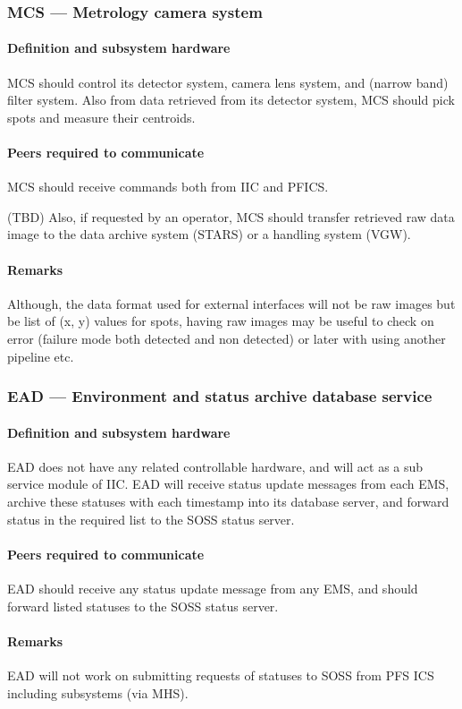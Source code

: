 \documentclass[a4paper,notitlepage]{article}
\begin{document}
\subsubsection{MCS --- Metrology camera system}
\paragraph{Definition and subsystem hardware}
MCS should control its detector system, camera lens system, and (narrow band) 
filter system. Also from data retrieved from its detector system, MCS should 
pick spots and measure their centroids. 
\paragraph{Peers required to communicate}
MCS should receive commands both from IIC and PFICS. 

(TBD) Also, if requested by an operator, 
MCS should transfer retrieved raw data image to the data archive system 
(STARS) or a handling system (VGW). 
\paragraph{Remarks}
Although, the data format used for external interfaces will not be raw 
images but be list of (x, y) values for spots, having raw images may be useful 
to check on error (failure mode both detected and non detected) or later 
with using another pipeline etc. 

\subsubsection{EAD --- Environment and status archive database service}
\paragraph{Definition and subsystem hardware}
EAD does not have any related controllable hardware, and will act as a sub 
service module of IIC. 
EAD will receive status update messages from each EMS, archive these statuses 
with each timestamp into its database server, and forward status in the 
required list to the SOSS status server. 
\paragraph{Peers required to communicate}
EAD should receive any status update message from any EMS, 
and should forward listed statuses to the SOSS status server. 
\paragraph{Remarks}
EAD will not work on submitting requests of statuses to SOSS from PFS ICS 
including subsystems (via MHS). 
\end{document}
